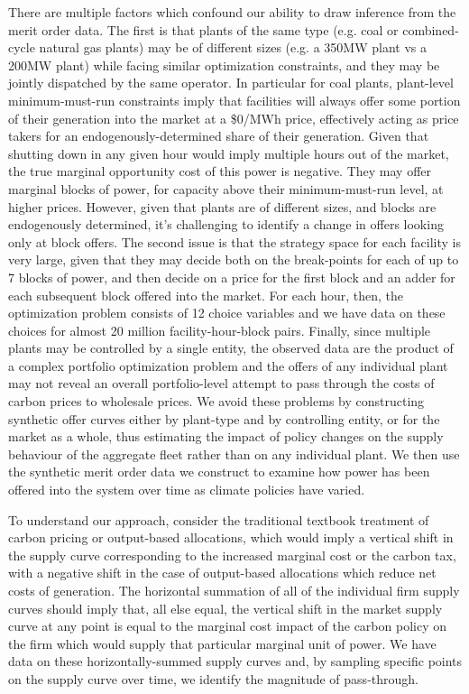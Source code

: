 \documentclass[12pt]{article}
\begin{document}
There are multiple factors which confound our ability to draw inference from the merit order data. The first is that plants of the same type (e.g. coal or combined-cycle natural gas plants) may be of different sizes (e.g. a 350MW plant vs a 200MW plant) while facing similar optimization constraints, and they may be jointly dispatched by the same operator. In particular for coal plants, plant-level minimum-must-run constraints imply that facilities will always offer some portion of their generation into the market at a \$0/MWh price, effectively acting as price takers for an endogenously-determined share of their generation. Given that shutting down in any given hour would imply multiple hours out of the market, the true marginal opportunity cost of this power is negative. They may offer marginal blocks of power, for capacity above their minimum-must-run level, at higher prices. However, given that plants are of different sizes, and blocks are endogenously determined, it's challenging to identify a change in offers looking only at block offers. The second issue is that the strategy space for each facility is very large, given that they may decide both on the break-points for each of up to 7 blocks of power, and then decide on a price for the first block and an adder for each subsequent block offered into the market. For each hour, then, the optimization problem consists of 12 choice variables and we have data on these choices for almost 20 million facility-hour-block pairs. Finally, since multiple plants may be controlled by a single entity, the observed data are the product of a complex portfolio optimization problem and the offers of any individual plant may not reveal an overall portfolio-level attempt to pass through the costs of carbon prices to wholesale prices. We avoid these problems by constructing synthetic offer curves either by plant-type and by controlling entity, or for the market as a whole, thus estimating the impact of policy changes on the supply behaviour of the aggregate fleet rather than on any individual plant. We then use the synthetic merit order data we construct to examine how power has been offered into the system over time as climate policies have varied.

To understand our approach, consider the traditional textbook treatment of carbon pricing or output-based allocations, which would imply a vertical shift in the supply curve corresponding to the increased marginal cost or the carbon tax, with a negative shift in the case of output-based allocations which reduce net costs of generation. The horizontal summation of all of the individual firm supply curves should imply that, all else equal, the vertical shift in the market supply curve at any point is equal to the marginal cost impact of the carbon policy on the firm which would supply that particular marginal unit of power. We have data on these horizontally-summed supply curves and, by sampling specific points on the supply curve over time, we identify the magnitude of pass-through.
\end{document}
